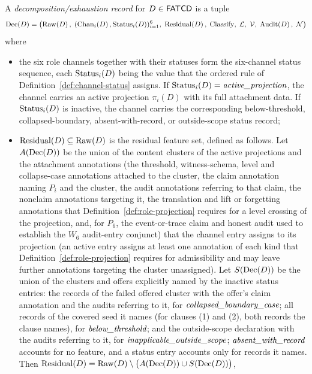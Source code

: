 \begin{definition}\label{def:decomposition-record}
A \emph{decomposition/exhaustion record} for \(D \in \mathsf{FATCD}{}\) is a tuple
\[
\operatorname{Dec}\!\left(D\right) = \bigl(\operatorname{Raw}\!\left(D\right),\; (\operatorname{Chan}_{i}\!\left(D\right), \operatorname{Status}_{i}\!\left(D\right))_{i=1}^{6},\;
\operatorname{Residual}\!\left(D\right),\; \mathrm{Classify},\; \mathcal{L},\; \mathcal{V},\;
\operatorname{Audit}\!\left(D\right),\; \mathcal{N}\bigr)
\]
where
\begin{itemize}[topsep=2pt,itemsep=1pt]
  \item the six role channels together with their statuses form the
    six-channel status sequence, each \(\operatorname{Status}_{i}\!\left(D\right)\) being the value that the
    ordered rule of Definition~\ref{def:channel-status} assigns. If \(\operatorname{Status}_{i}\!\left(D\right) = \textit{active\_\allowbreak projection}\), the channel
    carries an active projection \(\pi_i(D)\) with its full attachment
    data. If \(\operatorname{Status}_{i}\!\left(D\right)\) is inactive, the channel carries the
    corresponding below-threshold, collapsed-boundary,
    absent-with-record, or outside-scope status record;
  \item \(\operatorname{Residual}\!\left(D\right) \subseteq \operatorname{Raw}\!\left(D\right)\) is the residual feature set,
    defined as follows. Let \(A(\operatorname{Dec}\!\left(D\right))\) be the union of the content
    clusters of the active projections and the attachment annotations (the
    threshold, witness-schema, level and collapse-case annotations attached to
    the cluster, the claim annotation naming \(P_i\) and the cluster, the audit
    annotations referring to that claim, the nonclaim annotations targeting it, the translation and lift or
    forgetting annotations that Definition~\ref{def:role-projection} requires for
    a level crossing of the projection, and,
    for \(P_6\), the event-or-trace claim and honest audit used to establish
    the \(W_6\) audit-entry conjunct)
    that the channel entry assigns to its projection (an active entry assigns at least one annotation of each kind that Definition~\ref{def:role-projection} requires for admissibility and may leave further annotations targeting the cluster unassigned). Let \(S(\operatorname{Dec}\!\left(D\right))\) be the union of the
    clusters and offers explicitly named by the inactive status entries: the
    records of the failed offered cluster with the offer's claim annotation and the audits referring to it, for \(\textit{collapsed\_\allowbreak boundary\_\allowbreak case}\); all records of the covered seed it names (for clauses (1) and (2), both records the clause names), for
    \(\textit{below\_\allowbreak threshold}\); and the outside-scope declaration with the audits referring to it, for
    \(\textit{inapplicable\_\allowbreak outside\_\allowbreak scope}\); \(\textit{absent\_\allowbreak with\_\allowbreak record}\) accounts for no feature, and a status
    entry accounts only for records it names. Then
    \(\operatorname{Residual}\!\left(D\right)=\operatorname{Raw}\!\left(D\right)\setminus\bigl(A(\operatorname{Dec}\!\left(D\right))\cup S(\operatorname{Dec}\!\left(D\right))\bigr)\),

\end{itemize}
\end{definition}
